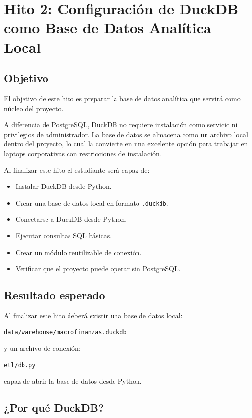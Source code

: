 \chapter{Hito 2: Configuración de DuckDB como Base de Datos Analítica Local}

\section{Objetivo}

El objetivo de este hito es preparar la base de datos analítica que servirá como núcleo del proyecto.

A diferencia de PostgreSQL, DuckDB no requiere instalación como servicio ni privilegios de administrador. La base de datos se almacena como un archivo local dentro del proyecto, lo cual la convierte en una excelente opción para trabajar en laptops corporativas con restricciones de instalación.

Al finalizar este hito el estudiante será capaz de:

\begin{itemize}
\item Instalar DuckDB desde Python.
\item Crear una base de datos local en formato \texttt{.duckdb}.
\item Conectarse a DuckDB desde Python.
\item Ejecutar consultas SQL básicas.
\item Crear un módulo reutilizable de conexión.
\item Verificar que el proyecto puede operar sin PostgreSQL.
\end{itemize}

\section{Resultado esperado}

Al finalizar este hito deberá existir una base de datos local:

\begin{verbatim}
data/warehouse/macrofinanzas.duckdb
\end{verbatim}

y un archivo de conexión:

\begin{verbatim}
etl/db.py
\end{verbatim}

capaz de abrir la base de datos desde Python.

\section{¿Por qué DuckDB?}

